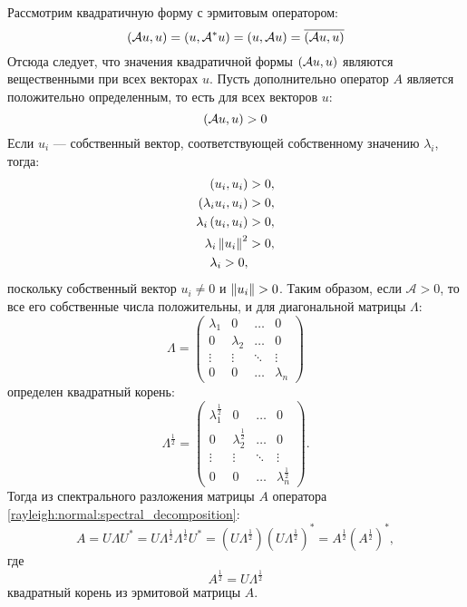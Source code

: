 Рассмотрим квадратичную форму с эрмитовым оператором:
\[
    \left ( \mathcal{A} u, u \right )
    = \left ( u, \mathcal{A}^* u \right )
    = \left ( u, \mathcal{A} u \right )
    = \overline{\left ( \mathcal{A} u, u \right )}
\]
Отсюда следует, что значения квадратичной формы $\left ( \mathcal{A} u, u \right )$ являются вещественными при всех векторах $u$. Пусть дополнительно оператор $A$
является положительно определенным, то есть для всех векторов $u$:
\[
    \left ( \mathcal{A} u, u \right ) > 0
\]
Если $u_i$ --- собственный вектор, соответствующей собственному значению $\lambda_i$, тогда:
\begin{align*}
    \left ( u_i, u_i \right ) & > 0 , \\
    \left ( \lambda_i u_i, u_i \right ) & > 0 , \\
    \lambda_i \left ( u_i, u_i \right ) & > 0 , \\
    \lambda_i \left \| u_i \right \|^2 & > 0 , \\
    \lambda_i > 0 ,
\end{align*}
поскольку собственный вектор $u_i \neq 0$ и $\left \| u_i \right \| > 0$. Таким образом, если $\mathcal{A} > 0$, то все его собственные числа положительны, и для диагональной
матрицы $\Lambda$:
\[
    \Lambda
    = \begin{pmatrix}
          \lambda_1 & 0         & \dots  & 0         \\
          0         & \lambda_2 & \dots  & 0         \\
          \vdots    & \vdots    & \ddots & \vdots    \\
          0         & 0         & \dots  & \lambda_n
    \end{pmatrix}
\]
определен квадратный корень:
\[
    \Lambda^\frac{1}{2}
    = \begin{pmatrix}
          \lambda_1^\frac{1}{2} & 0                     & \dots  & 0                     \\
          0                     & \lambda_2^\frac{1}{2} & \dots  & 0                     \\
          \vdots                & \vdots                & \ddots & \vdots                \\
          0                     & 0                     & \dots  & \lambda_n^\frac{1}{2}
    \end{pmatrix}
    .
\]
Тогда из спектрального разложения матрицы $A$ оператора \eqref{rayleigh:normal:spectral_decomposition}:
\[
    A
    = U \Lambda U^*
    = U \Lambda^\frac{1}{2} \Lambda^\frac{1}{2} U^*
    = \left ( U \Lambda^\frac{1}{2} \right ) \left ( U \Lambda^\frac{1}{2} \right )^*
    = A^\frac{1}{2} \left ( A^\frac{1}{2} \right )^*,
\]
где
\[
    A^\frac{1}{2} = U \Lambda^\frac{1}{2}
\]
квадратный корень из эрмитовой матрицы $A$.


